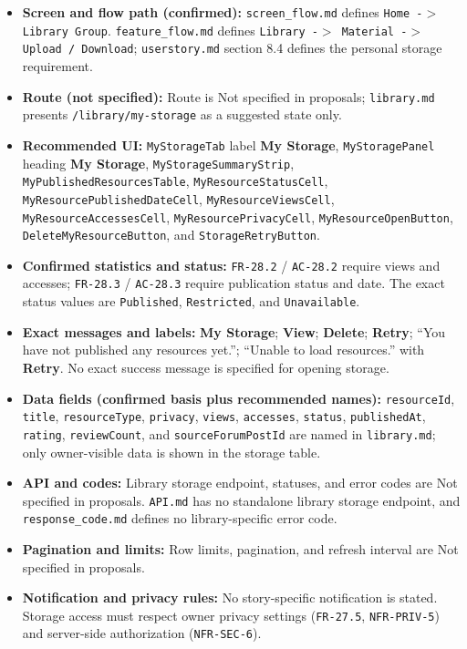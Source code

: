 \documentclass[12pt]{article}
\begin{document}
\begin{itemize}
\item \textbf{Screen and flow path (confirmed):} \texttt{screen\_flow.md} defines \texttt{Home -$>$ Library Group}. \texttt{feature\_flow.md} defines \texttt{Library -$>$ Material -$>$ Upload / Download}; \texttt{userstory.md} section 8.4 defines the personal storage requirement.
\item \textbf{Route (not specified):} Route is Not specified in proposals; \texttt{library.md} presents \texttt{/library/my-storage} as a suggested state only.
\item \textbf{Recommended UI:} \texttt{MyStorageTab} label \textbf{My Storage}, \texttt{MyStoragePanel} heading \textbf{My Storage}, \texttt{MyStorageSummaryStrip}, \texttt{MyPublishedResourcesTable}, \texttt{MyResourceStatusCell}, \texttt{MyResourcePublishedDateCell}, \texttt{MyResourceViewsCell}, \texttt{MyResourceAccessesCell}, \texttt{MyResourcePrivacyCell}, \texttt{MyResourceOpenButton}, \texttt{DeleteMyResourceButton}, and \texttt{StorageRetryButton}.
\item \textbf{Confirmed statistics and status:} \texttt{FR-28.2} / \texttt{AC-28.2} require views and accesses; \texttt{FR-28.3} / \texttt{AC-28.3} require publication status and date. The exact status values are \texttt{Published}, \texttt{Restricted}, and \texttt{Unavailable}.
\item \textbf{Exact messages and labels:} \textbf{My Storage}; \textbf{View}; \textbf{Delete}; \textbf{Retry}; “You have not published any resources yet.”; “Unable to load resources.” with \textbf{Retry}. No exact success message is specified for opening storage.
\item \textbf{Data fields (confirmed basis plus recommended names):} \texttt{resourceId}, \texttt{title}, \texttt{resourceType}, \texttt{privacy}, \texttt{views}, \texttt{accesses}, \texttt{status}, \texttt{publishedAt}, \texttt{rating}, \texttt{reviewCount}, and \texttt{sourceForumPostId} are named in \texttt{library.md}; only owner-visible data is shown in the storage table.
\item \textbf{API and codes:} Library storage endpoint, statuses, and error codes are Not specified in proposals. \texttt{API.md} has no standalone library storage endpoint, and \texttt{response\_code.md} defines no library-specific error code.
\item \textbf{Pagination and limits:} Row limits, pagination, and refresh interval are Not specified in proposals.
\item \textbf{Notification and privacy rules:} No story-specific notification is stated. Storage access must respect owner privacy settings (\texttt{FR-27.5}, \texttt{NFR-PRIV-5}) and server-side authorization (\texttt{NFR-SEC-6}).
\end{itemize}
\par\medskip
\end{document}
